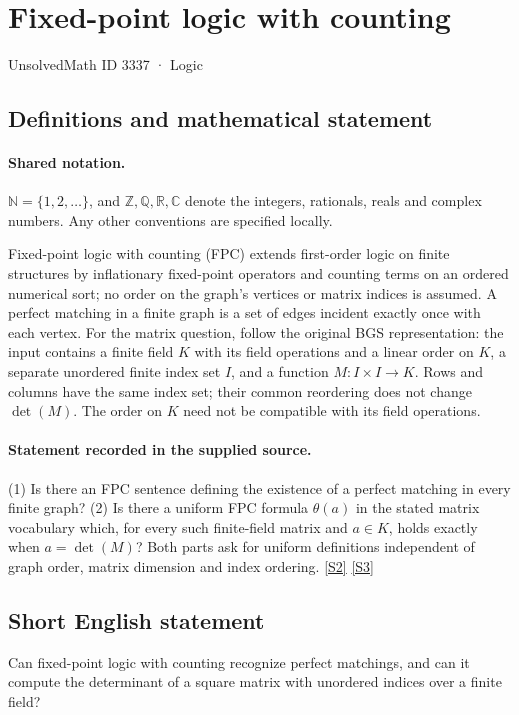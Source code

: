 \documentclass[11pt]{article}
\newcommand{\sref}[2]{\hyperlink{source:#1:#2}{[S#2]}}
\begin{document}
\setcounter{section}{3336}
\section{Fixed-point logic with counting}\label{3337}
{\small\sffamily UnsolvedMath ID 3337 · Logic}
\subsection{Definitions and mathematical statement}

\paragraph{Shared notation.}$\mathbb N=\{1,2,\ldots\}$, and $\mathbb Z,\mathbb Q,\mathbb R,\mathbb C$ denote the integers, rationals, reals and complex numbers. Any other conventions are specified locally.


Fixed-point logic with counting (FPC) extends first-order logic on finite structures by inflationary fixed-point operators and counting terms on an ordered numerical sort; no order on the graph's vertices or matrix indices is assumed. A perfect matching in a finite graph is a set of edges incident exactly once with each vertex. For the matrix question, follow the original BGS representation: the input contains a finite field $K$ with its field operations and a linear order on $K$, a separate unordered finite index set $I$, and a function $M:I\times I\to K$. Rows and columns have the same index set; their common reordering does not change $\det(M)$. The order on $K$ need not be compatible with its field operations.
\paragraph{Statement recorded in the supplied source.}
(1) Is there an FPC sentence defining the existence of a perfect matching in every finite graph? (2) Is there a uniform FPC formula $\theta(a)$ in the stated matrix vocabulary which, for every such finite-field matrix and $a\in K$, holds exactly when $a=\det(M)$? Both parts ask for uniform definitions independent of graph order, matrix dimension and index ordering. \sref{3337}{2} \sref{3337}{3}
\subsection{Short English statement}
Can fixed-point logic with counting recognize perfect matchings, and can it compute the determinant of a square matrix with unordered indices over a finite field?
\end{document}
